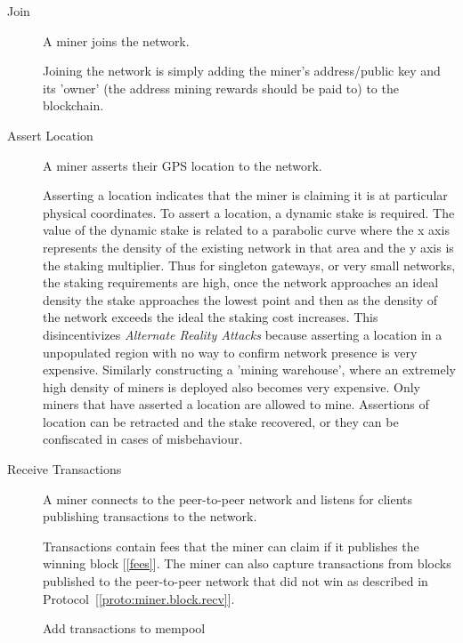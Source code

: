 \documentclass[letterpaper,11pt]{article}
\begin{document}
\begin{description}
  \item [Join] A miner joins the network.

    Joining the network is simply adding the miner's address/public key and its 'owner' (the address mining rewards should be paid to) to the blockchain.

  \item [Assert Location] A miner asserts their GPS location to the network.

    Asserting a location indicates that the miner is claiming it is at particular physical coordinates. To assert a location, a dynamic stake is required. The value of the dynamic stake is related to a parabolic curve where the x axis represents the density of the existing network in that area and the y axis is the staking multiplier. Thus for singleton gateways, or very small networks, the staking requirements are high, once the network approaches an ideal density the stake approaches the lowest point and then as the density of the network exceeds the ideal the staking cost increases. This disincentivizes \emph{Alternate Reality Attacks} because asserting a location in a unpopulated region with no way to confirm network presence is very expensive. Similarly constructing a 'mining warehouse', where an extremely high density of miners is deployed also becomes very expensive. Only miners that have asserted a location are allowed to mine. Assertions of location can be retracted and the stake recovered, or they can be confiscated in cases of misbehaviour.

  \item [Receive Transactions] A miner connects to the peer-to-peer network and listens for clients publishing transactions to the network.

    Transactions contain fees that the miner can claim if it publishes the winning block [\ref{fees}]. The miner can also capture transactions from blocks published to the peer-to-peer network that did not win as described in Protocol~[\ref{proto:miner.block.recv}].

    \begin{algorithm}[!htb]
      \DontPrintSemicolon
      \caption{Miner Receive Transactions}\label{proto:miner.trans.recv}

       {
        Add transactions to mempool\;
      }
    \end{algorithm}
    \FloatBarrier


\end{description}
\end{document}
